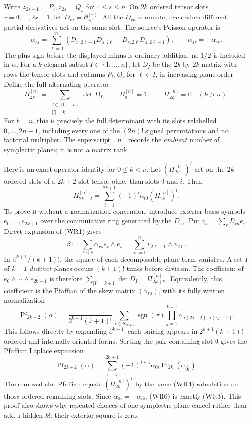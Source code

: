\documentclass[
  11pt,
]{article}
\begin{document}
Write \(z_{2s-1}=P_s,z_{2s}=Q_s\) for \(1\leq s\leq n\). On \(2k\)
ordered tensor slots \(r=0,\ldots,2k-1\), let
\(D_{ra}=\partial_{z_a}^{(r)}\). All the \(D_{ra}\) commute, even when
different partial derivatives act on the same slot. The source's Poisson
operator is \[
 \alpha_{rs}=\sum_{\ell=1}^n
 (D_{r,2\ell-1}D_{s,2\ell}
  -D_{r,2\ell}D_{s,2\ell-1}),\qquad
 \alpha_{sr}=-\alpha_{rs}.
 \tag{WR1}
\] The plus sign before the displayed minus is ordinary addition; no
\(1/2\) is included in \(\alpha\). For a \(k\)-element subset
\(I\subset\{1,\ldots,n\}\), let \(D_I\) be the \(2k\)-by-\(2k\) matrix
with rows the tensor slots and columns \(P_\ell,Q_\ell\) for
\(\ell\in I\), in increasing plane order. Define the full alternating
operator \[
 \Pi_{2k}^{[n]}=\sum_{\substack{I\subset\{1,\ldots,n\}\\|I|=k}}
       \det D_I,\qquad
 \Pi_0^{[n]}=1,\qquad
 \Pi_{2k}^{[n]}=0\quad(k>n).
 \tag{WR2}
\] For \(k=n\), this is precisely the full determinant with its slots
relabelled \(0,\ldots,2n-1\), including every one of the \((2n)!\)
signed permutations and no factorial multiplier. The superscript \([n]\)
records the \emph{ambient} number of symplectic planes; it is not a
matrix rank.

Here is an exact operator identity for \(0\leq k<n\). Let
\((\Pi_{2k}^{[n]})^i\) act on the \(2k\) ordered slots of a
\(2k+2\)-slot tensor other than slots \(0\) and \(i\). Then \[
 \boxed{\quad
 \Pi_{2k+2}^{[n]}
 =\sum_{i=1}^{2k+1}(-1)^i
       \alpha_{i0}(\Pi_{2k}^{[n]})^i .
 \quad}
 \tag{WR3}
\] To prove it without a normalization convention, introduce exterior
basis symbols \(e_0,\ldots,e_{2k+1}\) over the commutative ring
generated by the \(D_{ra}\). Put \(v_a=\sum_r D_{ra}e_r\). Direct
expansion of (WR1) gives \[
 \beta:=\sum_{r<s}\alpha_{rs}e_r\wedge e_s
      =\sum_{\ell=1}^{n}v_{2\ell-1}\wedge v_{2\ell}.
 \tag{WR4}
\] In \(\beta^{k+1}/(k+1)!\), the square of each decomposable plane term
vanishes. A set \(I\) of \(k+1\) \emph{distinct} planes occurs
\((k+1)!\) times before division. The coefficient of
\(e_0\wedge\cdots\wedge e_{2k+1}\) is therefore
\(\sum_{|I|=k+1}\det D_I=\Pi_{2k+2}^{[n]}\). Equivalently, this
coefficient is the Pfaffian of the skew matrix \((\alpha_{rs})\), with
its fully written normalization \[
 \operatorname{Pf}_{2k+2}(\alpha)
 =\frac{1}{2^{k+1}(k+1)!}
   \sum_{\sigma\in S_{2k+2}}\operatorname{sgn}(\sigma)
   \prod_{j=1}^{k+1}
      \alpha_{\sigma(2j-2),\sigma(2j-1)} .
 \tag{WR5}
\] This follows directly by expanding \(\beta^{k+1}\): each pairing
appears in \(2^{k+1}(k+1)!\) ordered and internally oriented forms.
Sorting the pair containing slot \(0\) gives the Pfaffian Laplace
expansion \[
 \operatorname{Pf}_{2k+2}(\alpha)
 =\sum_{i=1}^{2k+1}(-1)^{i+1}
       \alpha_{0i}\operatorname{Pf}_{2k}(\alpha_{\widehat0\widehat i}).
 \tag{WR6}
\] The removed-slot Pfaffian equals \((\Pi_{2k}^{[n]})^i\) by the same
(WR4) calculation on those ordered remaining slots. Since
\(\alpha_{0i}=-\alpha_{i0}\), (WR6) is exactly (WR3). This proof also
shows why repeated choices of one symplectic plane cancel rather than
add a hidden \(k!\): their exterior square is zero.
\end{document}
